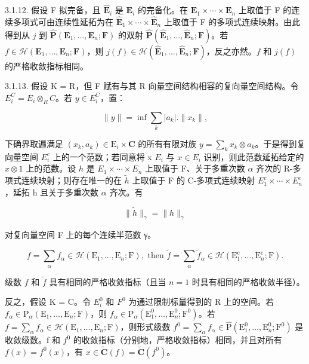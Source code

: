 3.1.12. 假设 F 拟完备，且 \(\hat{\mathbf{E}}_{i}\) 是 \(\mathbf{E}_{i}\) 的完备化。在 \(\mathbf{E}_{1} \times \cdots \times \mathbf{E}_{n}\) 上取值于 F 的连续多项式可由连续性延拓为在 \(\hat{\mathbf{E}}_{1} \times \cdots \times \hat{\mathbf{E}}_{n}\) 上取值于 F 的多项式连续映射。由此得到从 \(j\) 到 \(\hat{\mathbf{P}}(\mathbf{E}_{1}, \ldots, \mathbf{E}_{n}; \mathbf{F})\) 的双射 \(\hat{\mathbf{P}}(\hat{\mathbf{E}}_{1}, \ldots, \hat{\mathbf{E}}_{n}; \mathbf{F})\)。若 \(f \in \mathcal{H}(\mathbf{E}_{1}, \ldots, \mathbf{E}_{n}; \mathbf{F})\)，则 \(j(f) \in \mathcal{H}(\hat{\mathbf{E}}_{1}, \ldots, \hat{\mathbf{E}}_{n}; \mathbf{F})\)，反之亦然。\(f\) 和 \(j(f)\) 的严格收敛指标相同。

3.1.13. 假设 K = R，但 F 赋有与其 R 向量空间结构相容的复向量空间结构。令 \(E_{i}^{C} = E_{i} \otimes_{R} C\)。若 \(y \in E_{i}^{C}\)，置：

\[
\| y \| = \inf \sum_ {k} | a _ {k} |. \| x _ {k} \|,
\]

下确界取遍满足 \((x_{k}, a_{k}) \in \mathrm{E}_{i} \times \mathbf{C}\) 的所有有限对族 \(y = \sum_{k} x_{k} \otimes a_{k}\)。于是得到复向量空间 \(E_{i}^{c}\) 上的一个范数；若同意将 x  \(E_{i}\) 与 \(x \in E_{i}\) 识别，则此范数延拓给定的 \(x \otimes 1\) 上的范数。设 \(h\) 是 \(E_{1} \times \cdots \times E_{n}\) 上取值于 F、关于多重次数 \(\alpha\) 齐次的 R-多项式连续映射；则存在唯一的在 \(\tilde{h}\) 上取值于 F 的 C-多项式连续映射 \(E_{1}^{c} \times \cdots \times E_{n}^{c}\)，延拓 h 且关于多重次数 \(\alpha\) 齐次。有

\[
\| \tilde {h} \| _ {\gamma} = \| h \| _ {\gamma}
\]

对复向量空间 F 上的每个连续半范数 γ。

\[
f = \sum_ {\alpha} f _ {\alpha} \in \mathcal {H} (\mathrm{E} _ {1}, \dots , \mathrm{E} _ {n}; \mathrm{F}), \text {   then   } \tilde {f} = \sum_ {\alpha} \tilde {f} _ {\alpha} \in \mathcal {H} (\mathrm{E} _ {1} ^ {\mathrm{c}}, \dots , \mathrm{E} _ {n} ^ {\mathrm{c}}; \mathrm{F}).
\]

级数 \(f\) 和 \(\tilde{f}\) 具有相同的严格收敛指标（且当 \(n = 1\) 时具有相同的严格收敛半径）。

反之，假设 K = C。令 \(E_{i}^{0}\) 和 \(F^{0}\) 为通过限制标量得到的 R 上的空间。若 \(f_{\alpha} \in \mathrm{P}_{\alpha}(\mathrm{E}_{1}, \ldots, \mathrm{E}_{n}; \mathrm{F})\)，则 \(f_{\alpha} \in \mathrm{P}_{\alpha}(\mathrm{E}_{1}^{0}, \ldots, \mathrm{E}_{n}^{0}; \mathrm{F}^{0})\)。若 \(f = \sum_{\alpha} f_{\alpha} \in \mathcal{H}(\mathrm{E}_{1}, \ldots, \mathrm{E}_{n}; \mathrm{F})\)，则形式级数 \(f^{0} = \sum_{\alpha} f_{\alpha} \in \hat{\mathrm{P}}(\mathrm{E}_{1}^{0}, \ldots, \mathrm{E}_{n}^{0}; \mathrm{F}^{0})\) 是收敛级数。f 和 \(f^{0}\) 的收敛指标（分别地，严格收敛指标）相同，并且对所有 \(f(x) = f^{0}(x)\)，有 \(x \in \tilde{\mathbf{C}}(f) = \tilde{\mathbf{C}}(f^{0})\)。

